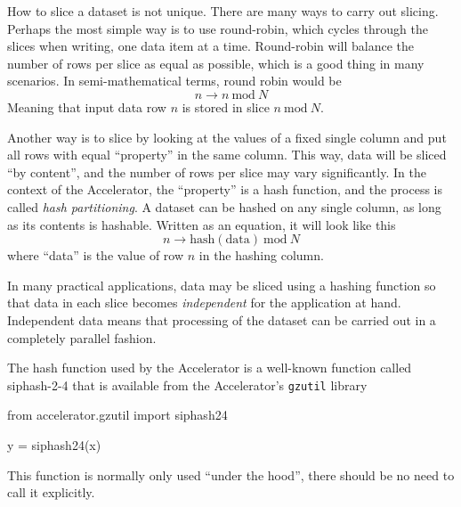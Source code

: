 How to slice a dataset is not unique.  There are many ways to carry
out slicing.  Perhaps the most simple way is to use round-robin, which
cycles through the slices when writing, one data item at a time.
Round-robin will balance the number of rows per slice as equal as
possible, which is a good thing in many scenarios.  In
semi-mathematical terms, round robin would be
\begin{equation*}
  n \longrightarrow n~\textrm{mod}~N
\end{equation*}
Meaning that input data row $n$ is stored in slice $n~\textrm{mod}~N$.

Another way is to slice by looking at the values of a fixed single
column and put all rows with equal ``property'' in the same column.
This way, data will be sliced ``by content'', and the number of rows
per slice may vary significantly.  In the context of the Accelerator,
the ``property'' is a hash function, and the process is
called \emph{hash partitioning}. A dataset can be hashed on any single
column, as long as its contents is hashable.  Written as an equation,
it will look like this
\begin{equation*}
  n \longrightarrow \textrm{hash}(\textrm{data})~\textrm{mod}~N
\end{equation*}
where ``data'' is the value of row $n$ in the hashing column.

In many practical applications, data may be sliced using a hashing
function so that data in each slice becomes \textsl{independent} for
the application at hand.  Independent data means that processing of
the dataset can be carried out in a completely parallel fashion.

The hash function used by the Accelerator is a well-known function
called siphash-2-4 that is available from the
Accelerator's \texttt{gzutil} library
\begin{python}
from accelerator.gzutil import siphash24

y = siphash24(x)
\end{python}
This function is normally only used ``under the hood'', there should
be no need to call it explicitly.



